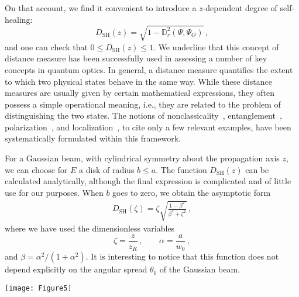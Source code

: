 \documentclass[10pt]{article}
\newcommand{\sugg}[1]{{#1}}
\begin{document}
On that account, we find it convenient to introduce a 
$z$-dependent degree of self-healing:
\begin{equation}
  \label{k125}
  D_{\mathrm{SH}} (z) = \sqrt{1 - \mathbb{D}_r^{2} (\Psi, \Psi_{O})} \, , 
\end{equation}
and one can check that $0 \leq D_{\mathrm{SH}} (z) \leq 1$. 
We underline that this concept of distance measure has been
successfully used in assessing a number of key concepts in quantum
optics. \sugg{In general, a distance measure quantifies the extent to
  which two physical states behave in the same way. While these
  distance measures are usually given by certain mathematical
  expressions, they often possess a simple operational meaning, i.e.,
  they are related to the problem of distinguishing the two states.}
The notions of nonclassicality~\cite{Hillery:1987aa},
entanglement~\cite{Vedral:1997aa}, polarization~\cite{Klimov:2005aa}, and
localization~\cite{local}, to cite only a few relevant examples, have
been systematically formulated within this framework. 

For a Gaussian beam, with cylindrical symmetry about the
propagation axis $z$,  we can choose for $E$ a disk of
radius $b \leq a$.  The function $  D_{\mathrm{SH}} (z)$ can be
calculated analytically, although the final expression is complicated and of
little use for our purposes. When $b$ goes to zero, we obtain the
asymptotic form 
\begin{align}
\label{k170}
  D_{\mathrm{SH}} (\zeta) = \zeta 
 \sqrt{\frac{1-\beta^2}{\beta^2 + \zeta^2}}  \, ,
\end{align}
where we have used the dimensionless variables
\begin{equation}
\zeta = \frac{z}{z_R} \, , \qquad
\alpha = \frac{a}{w_{0}} \, , 
\end{equation}
and $\beta = \alpha^2/(1 + \alpha^2)$.  It is interesting to
notice that this function does not depend explicitly on the angular
spread $\theta_0$ of the Gaussian beam.  

\begin{figure*}[t]
  \centerline{\texttt{[image: Figure5]}}
  \caption{ \label{fig5} (Left panel) Experimental setup used to check
    the self-healing of a fundamental Gaussian beam created by the
    He-Ne laser. (Right panel) Intensity scans recorded by the CCD
    camera at increasing distances $\zeta = 0, 0.5, 1.5, 4$ and $6.5$
    (from left to the right). The beam has a waist $w_{0} = 0.24$~mm,
    divergence $\theta_{0} = 0.84$~mrad, and Rayleigh range
    $z_{R} = 285$~mm. The upper row corresponds to the obstructed beam
    (with $\alpha = 0.206$), whereas the lower row is for the
    unobstructed beam.  In the first two scans, the images are very
    small, so we have included insets (in white frames) with enlarged
    pictures to better appreciate the patterns.}
\end{figure*}
\end{document}
